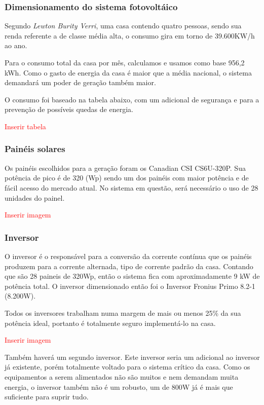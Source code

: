 \subsubsection{Dimensionamento do sistema fotovoltáico}
\par Segundo \textit{Lewton Burity Verri}, uma casa contendo quatro pessoas, sendo sua renda referente a de classe média alta, o consumo gira em torno de 39.600KW/h ao ano.
\par Para o consumo total da casa por mês, calculamos e usamos como base 956,2 kWh. Como o gasto de energia da casa é maior que a média nacional, o sistema demandará um poder de geração também maior.
\par O consumo foi baseado na tabela abaixo, com um adicional de segurança e para a prevenção de possíveis quedas de energia.

\textcolor{red}{Inserir tabela}

\subsubsection{Painéis solares}
\par Os painéis escolhidos para a geração foram os Canadian CSI CS6U-320P. Sua potência de pico é de 320 (Wp) sendo um dos painéis com maior potência e de fácil acesso do mercado atual. No sistema em questão, será necessário o uso de 28 unidades do painel.

\textcolor{red}{Inserir imagem}

\subsubsection{Inversor}
\par O inversor é o responsável para a conversão da corrente contínua que os painéis produzem para a corrente alternada, tipo de corrente padrão da casa. Contando que são 28 paineis de 320Wp, então o sistema fica com aproximadamente 9 kW de potência total. O inversor dimensionado então foi o Inversor Fronius Primo 8.2-1 (8.200W).
\par Todos os inversores trabalham numa margem de mais ou menos 25\% da sua potência ideal, portanto é totalmente seguro implementá-lo na casa.

\textcolor{red}{Inserir imagem}

\par Também haverá um segundo inversor. Este inversor seria um adicional ao inversor já existente, porém totalmente voltado para o sistema crítico da casa. Como os equipamentos a serem alimentados não são muitos e nem demandam muita energia, o inversor também não é um robusto, um de 800W já é mais que suficiente para suprir tudo.

